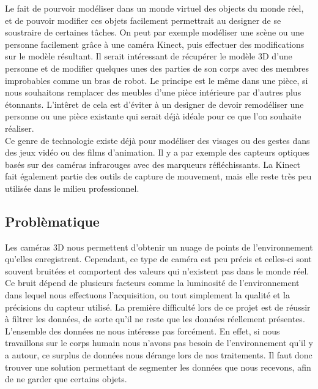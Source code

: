 Le fait de pourvoir modéliser dans un monde virtuel des objects du monde réel, et de pouvoir modifier ces 
objets facilement permettrait au designer de se soustraire de certaines tâches. On peut par exemple modéliser
une scène ou une personne facilement grâce à une caméra Kinect, puis effectuer des modifications sur le modèle résultant. Il serait
intéressant de récupérer le modèle 3D d'une personne et de modifier quelques unes des parties de son corps avec
des membres improbables comme un bras de robot. Le principe est le même dans une pièce, si nous souhaitons remplacer
des meubles d'une pièce intérieure par d'autres plus étonnants. L'intêret de cela est d'éviter à un designer de 
devoir remodéliser une personne ou une pièce existante qui serait déjà idéale pour ce que l'on souhaite réaliser.\\

Ce genre de technologie existe déjà pour modéliser des visages ou des gestes dans des jeux vidéo ou des films d'animation. 
Il y a par exemple des capteurs optiques basés sur des caméras infrarouges avec des marqueurs réfléchissants. La Kinect fait
également partie des outils de capture de mouvement, mais elle reste très peu utilisée dans le milieu professionnel.

\subsection{Problèmatique}
Les caméras 3D nous permettent d'obtenir un nuage de points de l'environnement qu'elles enregistrent. Cependant, ce 
type de caméra est peu précis et celles-ci sont souvent bruitées et comportent des valeurs qui n'existent pas dans le monde 
réel. Ce bruit dépend de plusieurs facteurs comme la luminosité de l'environnement dans lequel nous effectuons l'acquisition,
ou tout simplement la qualité et la précisions du capteur utilisé. La première difficulté lors de ce projet est de réussir 
à filtrer les données, de sorte qu'il ne reste que les données réellement présentes.
L'ensemble des données ne nous intéresse pas forcément. En effet, si nous travaillons sur le corps humain nous n'avons
pas besoin de l'environnement qu'il y a autour, ce surplus de données nous dérange lors de nos traitements. Il faut
donc trouver une solution permettant de segmenter les données que nous recevons, afin de ne garder que certains objets.\\ 
 
